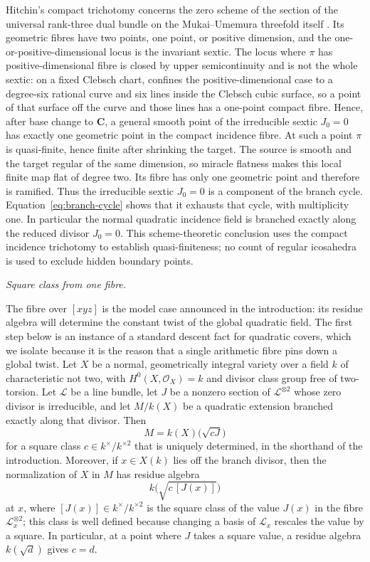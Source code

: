Hitchin's compact trichotomy concerns the zero scheme of the section of the
universal rank-three dual bundle on the Mukai--Umemura threefold itself
\cite[\S\S3--4, 8--9, especially Theorems~4--5]{HitchinBundles}.  Its
geometric fibres have two points, one point, or positive dimension, and the
one-or-positive-dimensional locus is the invariant sextic.  The locus where
\(\pi\) has positive-dimensional fibre is closed by upper semicontinuity and
is not the whole sextic: on a fixed Clebsch chart,
\cite[\S8.3, Theorem~4]{HitchinBundles} confines the positive-dimensional
case to a degree-six rational curve and six lines inside the Clebsch cubic
surface, so a point of that surface off the curve and those lines has a
one-point compact fibre.  Hence, after base change to \(\mathbf C\), a
general smooth point of
the irreducible sextic \(J_0=0\) has exactly one geometric point in the
compact incidence fibre.  At such a point \(\pi\) is quasi-finite, hence
finite after shrinking the target.  The source is smooth and the target
regular of the same dimension, so miracle flatness makes this local finite
map flat of degree two.  Its fibre has only one geometric point and therefore
is ramified.  Thus the irreducible sextic \(J_0=0\) is a component of the
branch cycle.  Equation~\eqref{eq:branch-cycle} shows that it exhausts that cycle, with
multiplicity one.  In particular the normal quadratic incidence field is
branched exactly along the reduced divisor \(J_0=0\).  This scheme-theoretic
conclusion uses the compact incidence trichotomy to establish
quasi-finiteness; no count of regular icosahedra is used to exclude hidden
boundary points.

\smallskip
\noindent\emph{Square class from one fibre.}\par
The fibre over \([xyz]\) is the model case announced in the introduction: its
residue algebra will determine the constant twist of the global quadratic
field.  The first step below is an instance of a standard descent fact for quadratic
covers, which we isolate because it is the reason that a single arithmetic
fibre pins down a global twist.  Let \(X\) be a normal, geometrically integral
variety over a field \(k\) of characteristic not two, with
\(H^0(X,\mathcal O_X)=k\) and divisor class group free of two-torsion.
Let \(\mathcal L\) be a line bundle, let \(J\) be a nonzero section of
\(\mathcal L^{\otimes2}\) whose zero divisor is irreducible, and let \(M/k(X)\)
be a quadratic extension branched exactly along that divisor.  Then
\[
 M=k(X)\bigl(\sqrt{cJ}\bigr)
\]
for a square class \(c\in k^\times/k^{\times2}\) that is uniquely determined,
in the shorthand of the introduction.  Moreover, if \(x\in X(k)\) lies off the
branch divisor, then the normalization of \(X\) in \(M\) has residue algebra
\[
 k\bigl(\sqrt{c\,[J(x)]}\bigr)
\]
at \(x\), where \([J(x)]\in k^\times/k^{\times2}\) is the square class of the
value \(J(x)\) in the fibre \(\mathcal L_x^{\otimes2}\); this class is well
defined because changing a basis of \(\mathcal L_x\) rescales the value by a
square.  In particular, at a point where \(J\) takes a square value, a residue
algebra \(k(\sqrt d)\) gives \(c=d\).

